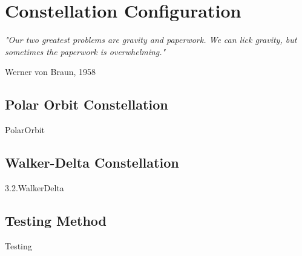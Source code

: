 \chapter{Constellation Configuration}

\epigraph{\textit{"Our two greatest problems are gravity and paperwork. We can lick gravity, but sometimes the paperwork is overwhelming."}}{Werner von Braun, 1958} 

\section{Polar Orbit Constellation}
{PolarOrbit}

\section{Walker-Delta Constellation}
{3.2.WalkerDelta}

\section{Testing Method}
{Testing}

